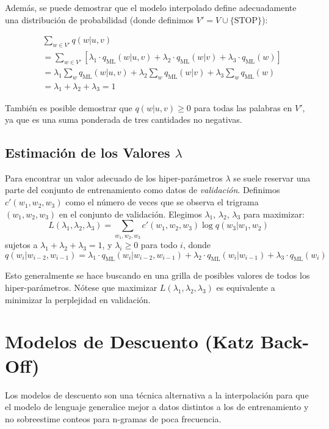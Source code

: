 \documentclass[11pt,fleqn]{book} %
\begin{document}
Además, se puede demostrar que el modelo interpolado define adecuadamente una distribución de probabilidad (donde definimos $V' = V \cup \{\text{STOP}\}$):

\[
\begin{aligned}
    & \sum_{w \in V'} q(w | u, v) \\
    &= \sum_{w \in V'} [\lambda_1 \cdot q_{\text{ML}}(w | u, v) + \lambda_2 \cdot q_{\text{ML}}(w | v) + \lambda_3 \cdot q_{\text{ML}}(w)] \\
    &= \lambda_1 \sum_{w} q_{\text{ML}}(w | u, v) + \lambda_2 \sum_{w} q_{\text{ML}}(w | v) + \lambda_3 \sum_{w} q_{\text{ML}}(w) \\
    &= \lambda_1 + \lambda_2 + \lambda_3 = 1
\end{aligned}
\]

También es posible demostrar que $q(w | u, v) \geq 0$ para todas las palabras en $V'$, ya que es una suma ponderada de tres cantidades no negativas.



\subsection{Estimación de los Valores $\lambda$}
Para encontrar un valor adecuado de los hiper-parámetros $\lambda$ se suele reservar una parte del conjunto de entrenamiento como datos de \textit{validación}. Definimos $c'(w_1, w_2, w_3)$ como el número de veces que se observa el trigrama $(w_1, w_2, w_3)$ en el conjunto de validación. Elegimos $\lambda_1$, $\lambda_2$, $\lambda_3$ para maximizar:
    \[
    L(\lambda_1, \lambda_2, \lambda_3) = \sum_{w_1,w_2,w_3} c'(w_1, w_2, w_3) \log q(w_3 | w_1, w_2)
    \]
    sujetos a $\lambda_1 + \lambda_2 + \lambda_3 = 1$, y $\lambda_i \geq 0$ para todo $i$, donde
    \[
    q(w_i | w_{i-2}, w_{i-1}) = \lambda_1 \cdot q_{\text{ML}}(w_i | w_{i-2}, w_{i-1}) + \lambda_2 \cdot q_{\text{ML}}(w_i | w_{i-1}) + \lambda_3 \cdot q_{\text{ML}}(w_i)
    \]
    
Esto generalmente se hace buscando en una grilla de posibles valores de todos los hiper-parámetros. Nótese que maximizar $L(\lambda_1, \lambda_2, \lambda_3)$ es equivalente a minimizar la perplejidad en validación.  


\section{Modelos de Descuento (Katz Back-Off)}

Los modelos de descuento son una técnica alternativa a la interpolación para que el modelo de lenguaje generalice mejor a datos distintos a los de entrenamiento y no sobreestime conteos para n-gramas de poca frecuencia.
\end{document}
